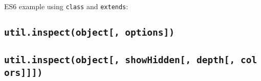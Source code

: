 ES6 example using \texttt{class} and \texttt{extends}:

\begin{Shaded}
\begin{Highlighting}[]
  \OperatorTok{=} \NormalTok{(}\NormalTok{)}\OperatorTok{;}

 \NormalTok{ \{}
    \NormalTok{(}\OperatorTok{,}\OperatorTok{;}
\NormalTok{  \}}
\NormalTok{\}}

\OperatorTok{=}  \NormalTok{()}\OperatorTok{;}

\NormalTok{(}\OperatorTok{,}\KeywordTok{=\textgreater{}}\NormalTok{ \{}
  \NormalTok{(}\SpecialCharTok{$\{}\SpecialCharTok{\}}\NormalTok{)}\OperatorTok{;}
\NormalTok{\})}\OperatorTok{;}
\NormalTok{(}\NormalTok{)}\OperatorTok{;}
\end{Highlighting}
\end{Shaded}

\subsection{\texorpdfstring{\texttt{util.inspect(object{[},\ options{]})}}{util.inspect(object{[}, options{]})}}\label{util.inspectobject-options}

\subsection{\texorpdfstring{\texttt{util.inspect(object{[},\ showHidden{[},\ depth{[},\ colors{]}{]}{]})}}{util.inspect(object{[}, showHidden{[}, depth{[}, colors{]}{]}{]})}}\label{util.inspectobject-showhidden-depth-colors}

